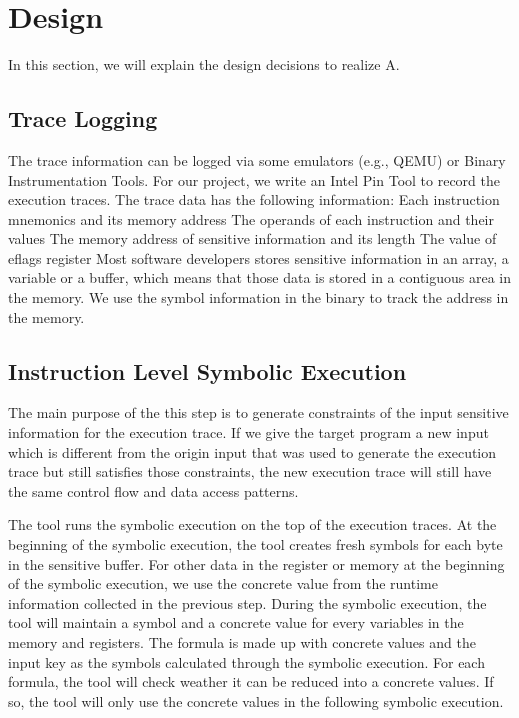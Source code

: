 \section{Design}
In this section, we will explain the design decisions to realize A. 


\subsection{Trace Logging}
The trace information can be logged via some emulators (e.g., QEMU) or Binary Instrumentation Tools. For our project, we write an Intel Pin Tool to record the execution traces. The trace data has the following information:
Each instruction mnemonics and its memory address
The operands of each instruction and their values
The memory address of sensitive information and its length
The value of eflags register
Most software developers stores sensitive information in an array, a variable or a buffer, which means that those data is stored in a contiguous area in the memory. We use the symbol information in the binary to track the address in the memory.

\subsection{Instruction Level Symbolic Execution}
The main purpose of the this step is to generate constraints of the input sensitive information for the execution trace. If we give the target program a new input which is different from the origin input that was used to generate the execution trace but still satisfies those constraints, the new execution trace will still have the same control flow and data access patterns. 

The tool runs the symbolic execution on the top of the execution traces. At the beginning of the symbolic execution, the tool creates fresh symbols for each byte in the sensitive buffer. For other data in the register or memory at the beginning of the symbolic execution, we use the concrete value from the runtime information collected in the previous step. During the symbolic execution, the tool will maintain a symbol and a concrete value for every variables in the memory and registers. The formula is made up with concrete values and the input key as the symbols calculated through the symbolic execution. For each formula, the tool will check weather it can be reduced into a concrete values. If so, the tool will only use the concrete values in the following symbolic execution.

